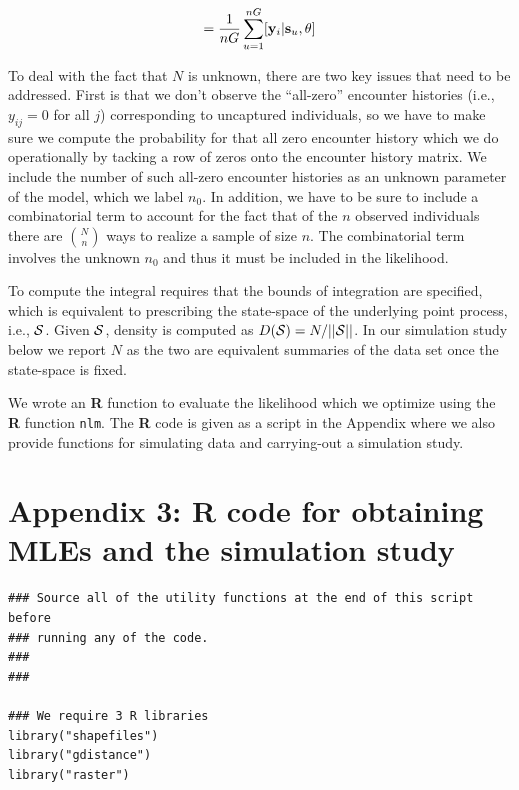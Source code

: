 \documentclass[12pt]{article}
\begin{document}
\begin{spacing}{1.2}
\begin{equation}
         [{\bf y}_{i}|\theta] = \frac{1}{nG} \sum_{u=1}^{nG}  [ {\bf
            y}_{i} |{\bf s}_u, \theta]
\label{mle.eq.intlik}
\end{equation}

To deal with the fact that $N$ is unknown, there are two key issues
that need to be addressed.  First is that we don't observe the
``all-zero'' encounter histories (i.e., $y_{ij} = 0$ for all $j$)
corresponding to uncaptured individuals, so we have to make sure we
compute the probability for that all zero encounter history which we
do operationally by tacking a row of zeros onto the encounter history
matrix. We include the number of such all-zero encounter histories as
an unknown parameter of the model, which we label $n_{0}$.  In
addition, we have to be sure to include a combinatorial term to
account for the fact that of the $n$ observed individuals there are
${N \choose n}$ ways to realize a sample of size $n$. The
combinatorial term involves the unknown $n_{0}$ and thus it must be
included in the likelihood.

To compute the integral requires that the bounds of integration are
specified, which is equivalent to prescribing the state-space of the
underlying point process, i.e., ${\cal S}$. Given ${\cal S}$, density
is
computed as $D({\cal S}) = N/||{\cal S}||$. In our simulation study
below we report $N$ as the two are equivalent summaries of the data
set once the state-space is fixed.

We wrote an {\bf R} function to evaluate the likelihood which we optimize
using the {\bf R} function \mbox{\tt nlm}.
The {\bf R} code is given as a script in the Appendix where we also
provide functions for simulating data and carrying-out a simulation study.



\section*{Appendix 3: {\bf R} code for obtaining MLEs and the
  simulation study}

{\small
\begin{verbatim}
### Source all of the utility functions at the end of this script before
### running any of the code. 
###
###

### We require 3 R libraries
library("shapefiles")
library("gdistance")
library("raster")


\end{verbatim}}
\end{spacing}
\end{document}

